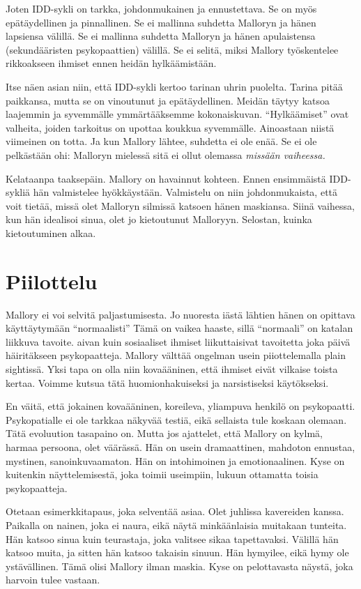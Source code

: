 Joten IDD-sykli on tarkka, johdonmukainen ja ennustettava. Se on myös epätäydellinen ja pinnallinen. Se ei mallinna suhdetta Malloryn ja hänen lapsiensa välillä. Se ei mallinna suhdetta Malloryn ja hänen apulaistensa (sekundääristen psykopaattien) välillä. Se ei selitä, miksi Mallory työskentelee rikkoakseen ihmiset ennen heidän hylkäämistään.

Itse näen asian niin, että IDD-sykli kertoo tarinan uhrin puolelta. Tarina pitää paikkansa, mutta se on vinoutunut ja epätäydellinen. Meidän täytyy katsoa laajemmin ja syvemmälle ymmärtääksemme kokonaiskuvan. ``Hylkäämiset'' ovat valheita, joiden tarkoitus on upottaa koukkua syvemmälle. Ainoastaan niistä viimeinen on totta. Ja kun Mallory lähtee, suhdetta ei ole enää. Se ei ole pelkästään ohi: Malloryn mielessä sitä ei ollut olemassa \emph{missään vaiheessa.}

Kelataanpa taaksepäin. Mallory on havainnut kohteen. Ennen ensimmäistä IDD-sykliä hän valmistelee hyökkäystään. Valmistelu on niin johdonmukaista, että voit tietää, missä olet Malloryn silmissä katsoen hänen maskiansa. Siinä vaihessa, kun hän idealisoi sinua, olet jo kietoutunut Malloryyn. Selostan, kuinka kietoutuminen alkaa.

\section{Piilottelu}

Mallory ei voi selvitä paljastumisesta. Jo nuoresta iästä lähtien hänen on opittava käyttäytymään ``normaalisti'' Tämä on vaikea haaste, sillä ``normaali'' on katalan liikkuva tavoite. aivan kuin sosiaaliset ihmiset liikuttaisivat tavoitetta joka päivä häiritäkseen psykopaatteja. Mallory välttää ongelman usein piiottelemalla plain sightissä. Yksi tapa on olla niin kovaääninen, että ihmiset eivät vilkaise toista kertaa. Voimme kutsua tätä huomionhakuiseksi ja narsistiseksi käytökseksi.

En väitä, että jokainen kovaääninen, koreileva, yliampuva henkilö on psykopaatti. Psykopatialle ei ole tarkkaa näkyvää testiä, eikä sellaista tule koskaan olemaan. Tätä evoluution tasapaino on. Mutta jos ajattelet, että Mallory on kylmä, harmaa persoona, olet  väärässä. Hän on usein dramaattinen, mahdoton ennustaa, mystinen, sanoinkuvaamaton. Hän on intohimoinen ja emotionaalinen. Kyse on kuitenkin näyttelemisestä, joka toimii useimpiin, lukuun ottamatta toisia psykopaatteja.

Otetaan esimerkkitapaus, joka selventää asiaa. Olet juhlissa kavereiden kanssa. Paikalla on nainen, joka ei naura, eikä näytä minkäänlaisia muitakaan tunteita. Hän katsoo sinua kuin teurastaja, joka valitsee sikaa tapettavaksi. Välillä hän katsoo muita, ja sitten hän katsoo takaisin sinuun. Hän hymyilee, eikä hymy ole ystävällinen. Tämä olisi Mallory ilman maskia. Kyse on pelottavasta näystä, joka harvoin tulee vastaan.

